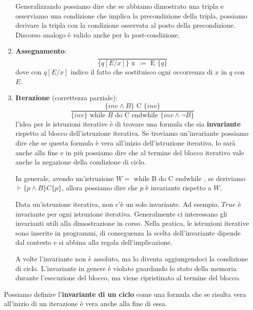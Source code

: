 \begin{enumerate}
          Generalizzando possiamo dire che se abbiamo dimostrato una tripla e
          osserviamo una condizione che implica la precondizione della tripla,
          possiamo derivare la tripla con la condizione osservata al posto della
          precondizione. Discorso analogo è valido anche per la post-condizione.
    \item \textbf{Assegnamento}:
          \begin{equation}
              \frac{}{\{q[E/x]\} \text{ x } := \text{ E }\{q\}}
          \end{equation}
          dove con $q[E / x]$ indico il fatto che sostituisco ogni occorrenza di
          $x$ in $q$ con $E$.
    \item \textbf{Iterazione} (correttezza parziale):
          \begin{equation}
              \frac{\{inv \land B\} \text{ C } \{inv\}}{\{inv\} \text{ while } B
                  \text{ do C endwhile } \{inv \land \lnot B\}}
          \end{equation}
          l'idea per le istruzioni iterative è di trovare una formula che sia
          \textbf{invariante} rispetto al blocco dell'istruzione iterativa. Se
          troviamo un'invariante possiamo dire che se questa formula è vera
          all'inizio dell'istruzione iterativa, lo sarà anche alla fine e in più
          possiamo dire che al termine del blocco iterativo vale anche la
          negazione della condizione di ciclo.

          In generale, avendo un'istruzione $W = \text{ while B do C endwhile }$,
          se deriviamo $\vdash \{p \land B\} C \{p\}$, allora possiamo dire che
          $p$ è invariante rispetto a $W$.

          Data un'istruzione iterativa, non c'è un solo invariante. Ad esempio,
          $True$ è invariante per ogni istruzione iterativa. Generalmente ci
          interessano gli invarianti utili alla dimostrazione in corso. Nella
          pratica, le istruzioni iterative sono inserite in programmi, di
          conseguenza la scelta dell'invariante dipende dal contesto e si abbina
          alla regola dell'implicazione.

          A volte l'invariante non è assoluto, ma lo diventa aggiungendoci la
          condizione di ciclo. L'invariante in genere è violato guardando lo
          stato della memoria durante l'esecuzione del blocco, ma viene
          ripristinato al termine del blocco.
\end{enumerate}
\begin{definizione}
    Possiamo definire l'\textbf{invariante di un ciclo} come una formula che se
    risulta vera all'inizio di un iterazione è vera anche alla fine di essa.
\end{definizione}
